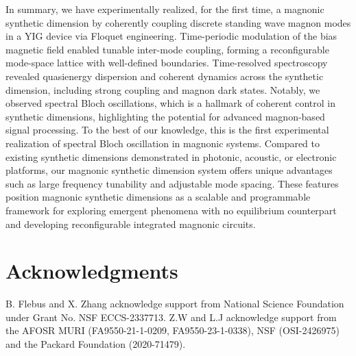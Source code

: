 \documentclass[
twocolumn,

superscriptaddress,









 amsmath,amssymb,
 aps,


prl,




]{revtex4-2}
\begin{document}
In summary, we have experimentally realized, for the first time, a magnonic synthetic dimension by coherently coupling discrete standing wave magnon modes in a YIG device via Floquet engineering. Time-periodic modulation of the bias magnetic field enabled tunable inter-mode coupling, forming a reconfigurable mode-space lattice with well-defined boundaries. Time-resolved spectroscopy revealed quasienergy dispersion and coherent dynamics across the synthetic dimension, including strong coupling and magnon dark states. Notably, we observed spectral Bloch oscillations, which is a hallmark of coherent control in synthetic dimensions, highlighting the potential for advanced magnon-based signal processing. To the best of our knowledge, this is the first experimental realization of spectral Bloch oscillation in magnonic systems. Compared to existing synthetic dimensions demonstrated in photonic, acoustic, or electronic platforms, our magnonic synthetic dimension system offers unique advantages such as large frequency tunability and adjustable mode spacing. These features position magnonic synthetic dimensions as a scalable and programmable framework for exploring emergent phenomena with no equilibrium counterpart and developing reconfigurable integrated magnonic circuits.




\section{Acknowledgments}
\begin{acknowledgments}

B. Flebus and X. Zhang acknowledge support from National Science Foundation under Grant No. NSF ECCS-2337713. Z.W and L.J acknowledge support from the AFOSR MURI (FA9550-21-1-0209, FA9550-23-1-0338), NSF (OSI-2426975) and the Packard Foundation (2020-71479).
\end{acknowledgments}
\end{document}
